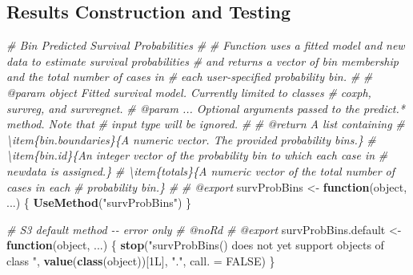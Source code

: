 \documentclass[
]{book}
\newenvironment{Shaded}{\begin{snugshade}}{\end{snugshade}}
\newcommand{\AttributeTok}[1]{\textcolor[rgb]{0.13,0.29,0.53}{#1}}
\newcommand{\CommentTok}[1]{\textcolor[rgb]{0.56,0.35,0.01}{\textit{#1}}}
\newcommand{\ConstantTok}[1]{\textcolor[rgb]{0.56,0.35,0.01}{#1}}
\newcommand{\ControlFlowTok}[1]{\textcolor[rgb]{0.13,0.29,0.53}{\textbf{#1}}}
\newcommand{\FunctionTok}[1]{\textcolor[rgb]{0.13,0.29,0.53}{\textbf{#1}}}
\newcommand{\NormalTok}[1]{#1}
\newcommand{\OtherTok}[1]{\textcolor[rgb]{0.56,0.35,0.01}{#1}}
\newcommand{\StringTok}[1]{\textcolor[rgb]{0.31,0.60,0.02}{#1}}
\begin{document}
\hypertarget{results-construction-and-testing}{%
\subsection{Results Construction and Testing}\label{results-construction-and-testing}}

\begin{Shaded}
\begin{Highlighting}[]
\CommentTok{\#\textquotesingle{} Bin Predicted Survival Probabilities}
\CommentTok{\#\textquotesingle{} }
\CommentTok{\#\textquotesingle{} Function uses a fitted model and new data to estimate survival probabilities}
\CommentTok{\#\textquotesingle{}   and returns a vector of bin membership and the total number of cases in}
\CommentTok{\#\textquotesingle{}   each user{-}specified probability bin.}
\CommentTok{\#\textquotesingle{}   }
\CommentTok{\#\textquotesingle{} @param object Fitted survival model. Currently limited to classes}
\CommentTok{\#\textquotesingle{}   \textasciigrave{}coxph\textasciigrave{}, \textasciigrave{}survreg\textasciigrave{}, and \textasciigrave{}survregnet\textasciigrave{}.}
\CommentTok{\#\textquotesingle{} @param ... Optional arguments passed to the \textasciigrave{}predict.*\textasciigrave{} method. Note that}
\CommentTok{\#\textquotesingle{}   input \textasciigrave{}type\textasciigrave{} will be ignored.}
\CommentTok{\#\textquotesingle{} }
\CommentTok{\#\textquotesingle{} @return A list containing}
\CommentTok{\#\textquotesingle{} \textbackslash{}item\{bin.boundaries\}\{A numeric vector. The provided probability bins.\}}
\CommentTok{\#\textquotesingle{} \textbackslash{}item\{bin.id\}\{An integer vector of the probability bin to which each case in }
\CommentTok{\#\textquotesingle{}   \textasciigrave{}newdata\textasciigrave{} is assigned.\}}
\CommentTok{\#\textquotesingle{} \textbackslash{}item\{totals\}\{A numeric vector of the total number of cases in each }
\CommentTok{\#\textquotesingle{}   probability bin.\}}
\CommentTok{\#\textquotesingle{} }
\CommentTok{\#\textquotesingle{} @export}
\NormalTok{survProbBins }\OtherTok{\textless{}{-}} \ControlFlowTok{function}\NormalTok{(object, ...) \{ }\FunctionTok{UseMethod}\NormalTok{(}\StringTok{"survProbBins"}\NormalTok{) \}}

\CommentTok{\#\textquotesingle{} S3 default method {-}{-} error only}
\CommentTok{\#\textquotesingle{} @noRd}
\CommentTok{\#\textquotesingle{} @export}
\NormalTok{survProbBins.default }\OtherTok{\textless{}{-}} \ControlFlowTok{function}\NormalTok{(object, ...) \{}
  \FunctionTok{stop}\NormalTok{(}\StringTok{"\textasciigrave{}survProbBins()\textasciigrave{} does not yet support objects of class "}\NormalTok{,}
       \FunctionTok{value}\NormalTok{(}\FunctionTok{class}\NormalTok{(object))[1L], }\StringTok{"."}\NormalTok{, }\AttributeTok{call. =} \ConstantTok{FALSE}\NormalTok{)}
\NormalTok{\}}


\end{Highlighting}
\end{Shaded}
\end{document}
